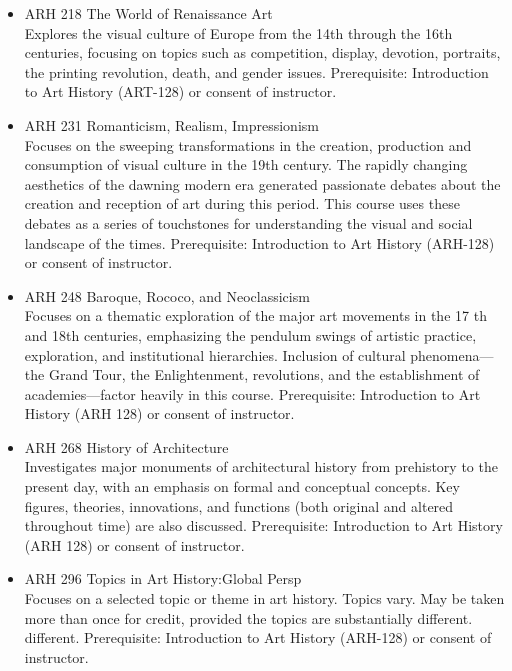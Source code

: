 \documentclass[
  letterpaper,
]{scrbook}
\begin{document}
\begin{itemize}
\item
  ARH 218 The World of Renaissance Art\\
  Explores the visual culture of Europe from the 14th through the 16th
  centuries, focusing on topics such as competition, display, devotion,
  portraits, the printing revolution, death, and gender issues.
  Prerequisite: Introduction to Art History (ART-128) or consent of
  instructor.\\
\item
  ARH 231 Romanticism, Realism, Impressionism\\
  Focuses on the sweeping transformations in the creation, production
  and consumption of visual culture in the 19th century. The rapidly
  changing aesthetics of the dawning modern era generated passionate
  debates about the creation and reception of art during this period.
  This course uses these debates as a series of touchstones for
  understanding the visual and social landscape of the times.
  Prerequisite: Introduction to Art History (ARH-128) or consent of
  instructor.\\
\item
  ARH 248 Baroque, Rococo, and Neoclassicism\\
  Focuses on a thematic exploration of the major art movements in the 17
  th and 18th centuries, emphasizing the pendulum swings of artistic
  practice, exploration, and institutional hierarchies. Inclusion of
  cultural phenomena---the Grand Tour, the Enlightenment, revolutions,
  and the establishment of academies---factor heavily in this course.
  Prerequisite: Introduction to Art History (ARH 128) or consent of
  instructor.\\
\item
  ARH 268 History of Architecture\\
  Investigates major monuments of architectural history from prehistory
  to the present day, with an emphasis on formal and conceptual
  concepts. Key figures, theories, innovations, and functions (both
  original and altered throughout time) are also discussed.
  Prerequisite: Introduction to Art History (ARH 128) or consent of
  instructor.\\
\item
  ARH 296 Topics in Art History:Global Persp\\
  Focuses on a selected topic or theme in art history. Topics vary. May
  be taken more than once for credit, provided the topics are
  substantially different. different. Prerequisite: Introduction to Art
  History (ARH-128) or consent of instructor.\\

\end{itemize}
\end{document}
